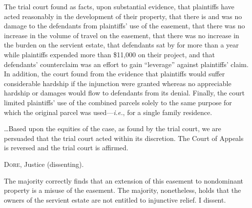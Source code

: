 The trial court found as facts, upon substantial evidence, that plaintiffs have
acted reasonably in the development of their property, that there is and was no
damage to the defendants from plaintiffs' use of the easement, that there was no
increase in the volume of travel on the easement, that there was no increase in
the burden on the servient estate, that defendants sat by for more than a year
while plaintiffs expended more than \$11,000 on their project, and that
defendants' counterclaim was an effort to gain ``leverage'' against plaintiffs'
claim. In addition, the court found from the evidence that plaintiffs would
suffer considerable hardship if the injunction were granted whereas no
appreciable hardship or damages would flow to defendants from its denial.
Finally, the court limited plaintiffs' use of the combined parcels solely to the
same purpose for which the original parcel was used---\textit{i.e.},  for a
single family residence.

\ldots Based upon the equities of the case, as found by the trial court, we are
persuaded that the trial court acted within its discretion. The Court of Appeals
is reversed and the trial court is affirmed.

\opinion \textsc{Dore}, Justice (dissenting).

The majority correctly finds that an extension of this easement to nondominant
property is a misuse of the easement. The majority, nonetheless, holds that the
owners of the servient estate are not entitled to injunctive relief. I dissent.


